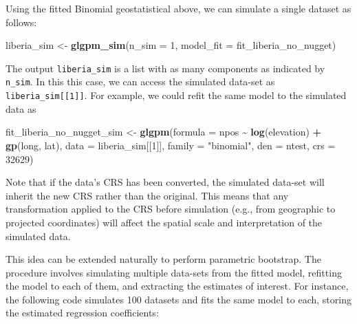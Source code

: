 \documentclass[
  letterpaper,
]{krantz}
\newenvironment{Shaded}{\begin{snugshade}}{\end{snugshade}}
\newcommand{\AttributeTok}[1]{\textcolor[rgb]{0.13,0.29,0.53}{#1}}
\newcommand{\DecValTok}[1]{\textcolor[rgb]{0.00,0.00,0.81}{#1}}
\newcommand{\FunctionTok}[1]{\textcolor[rgb]{0.13,0.29,0.53}{\textbf{#1}}}
\newcommand{\NormalTok}[1]{#1}
\newcommand{\OtherTok}[1]{\textcolor[rgb]{0.56,0.35,0.01}{#1}}
\newcommand{\SpecialCharTok}[1]{\textcolor[rgb]{0.81,0.36,0.00}{\textbf{#1}}}
\newcommand{\StringTok}[1]{\textcolor[rgb]{0.31,0.60,0.02}{#1}}
\begin{document}
Using the fitted Binomial geostatistical above, we can simulate a single
dataset as follows:

\begin{Shaded}
\begin{Highlighting}[]
\NormalTok{liberia\_sim }\OtherTok{\textless{}{-}} \FunctionTok{glgpm\_sim}\NormalTok{(}\AttributeTok{n\_sim =} \DecValTok{1}\NormalTok{, }\AttributeTok{model\_fit =}\NormalTok{ fit\_liberia\_no\_nugget)}
\end{Highlighting}
\end{Shaded}

The output \texttt{liberia\_sim} is a list with as many components as
indicated by \texttt{n\_sim}. In this this case, we can access the
simulated data-set as \texttt{liberia\_sim{[}{[}1{]}{]}}. For example,
we could refit the same model to the simulated data as

\begin{Shaded}
\begin{Highlighting}[]
\NormalTok{fit\_liberia\_no\_nugget\_sim }\OtherTok{\textless{}{-}} 
\FunctionTok{glgpm}\NormalTok{(}\AttributeTok{formula =}\NormalTok{ npos }\SpecialCharTok{\textasciitilde{}} \FunctionTok{log}\NormalTok{(elevation) }\SpecialCharTok{+} \FunctionTok{gp}\NormalTok{(long, lat), }
    \AttributeTok{data =}\NormalTok{ liberia\_sim[[}\DecValTok{1}\NormalTok{]], }\AttributeTok{family =} \StringTok{"binomial"}\NormalTok{, }\AttributeTok{den =}\NormalTok{ ntest, }
    \AttributeTok{crs =} \DecValTok{32629}\NormalTok{)}
\end{Highlighting}
\end{Shaded}

Note that if the data's CRS has been converted, the simulated data-set
will inherit the new CRS rather than the original. This means that any
transformation applied to the CRS before simulation (e.g., from
geographic to projected coordinates) will affect the spatial scale and
interpretation of the simulated data.

This idea can be extended naturally to perform parametric bootstrap. The
procedure involves simulating multiple data-sets from the fitted model,
refitting the model to each of them, and extracting the estimates of
interest. For instance, the following code simulates 100 datasets and
fits the same model to each, storing the estimated regression
coefficients:
\end{document}
